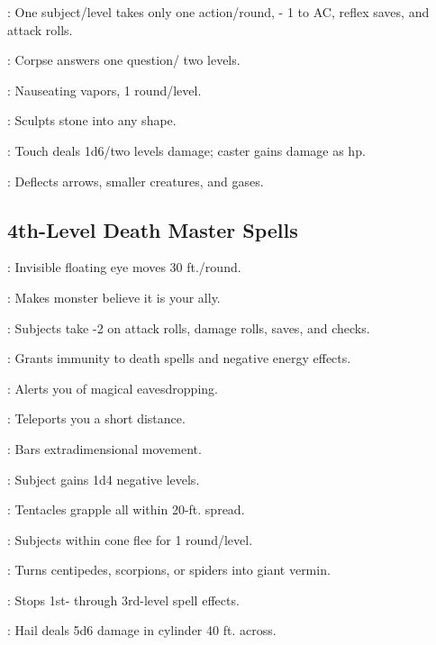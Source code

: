 \begin{multicols}{2}
\begin{description*}
\item[\linkspell{Slow}:] One subject/level takes only one action/round, - 1 to AC, reflex saves, and attack rolls.
\item[\linkspell{Speak with Dead}:] Corpse answers one question/ two levels.
\item[\linkspell{Stinking Cloud}:] Nauseating vapors, 1 round/level.
\item[\linkspell{Stone Shape}:] Sculpts stone into any shape.
\item[\linkspell{Vampiric Touch}:] Touch deals 1d6/two levels damage; caster gains damage as hp.
\item[\linkspell{Wind Wall}:] Deflects arrows, smaller creatures, and gases.
\end{description*}

\subsection{4th-Level Death Master Spells}
\begin{description*}
\item[\linkspell{Arcane Eye}:] Invisible floating eye moves 30 ft./round.
\item[\linkspell{Charm Monster}:] Makes monster believe it is your ally.
\item[\linkspell{Crushing Despair}:] Subjects take -2 on attack rolls, damage rolls, saves, and checks.
\item[\linkspell{Death Ward}:] Grants immunity to death spells and negative energy effects.
\item[\linkspell{Detect Scrying}:] Alerts you of magical eavesdropping.
\item[\linkspell{Dimension Door}:] Teleports you a short distance.
\item[\linkspell{Dimensional Anchor}:] Bars extradimensional movement.
\item[\linkspell{Enervation}:] Subject gains 1d4 negative levels.
\item[\linkspell{Evard's Black Tentacles}:] Tentacles grapple all within 20-ft. spread.
\item[\linkspell{Fear}:] Subjects within cone flee for 1 round/level.
\item[\linkspell{Giant Vermin}:] Turns centipedes, scorpions, or spiders into giant vermin.
\item[\linkspell{Globe of Invulnerability, Lesser}:] Stops 1st- through 3rd-level spell effects.
\item[\linkspell{Ice Storm}:] Hail deals 5d6 damage in cylinder 40 ft. across.

\end{description*}
\end{multicols}

